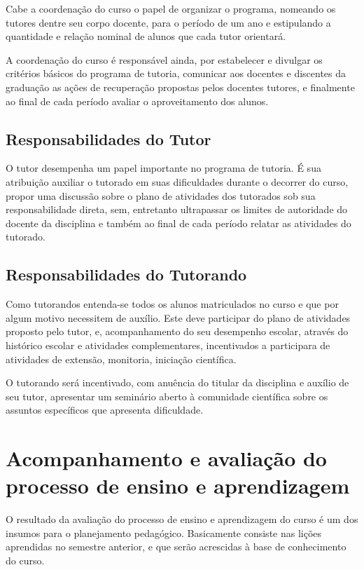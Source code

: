 \documentclass[
	12pt,				%
	openright,			%
  oneside,     %
	a4paper,			%
	english,			%
	french,				%
	spanish,			%
	brazil				%
	]{abntex2}
\begin{document}
Cabe a coordenação do curso o papel de organizar o programa, nomeando os tutores dentre seu corpo docente, para o período de um ano e estipulando a quantidade e relação nominal de alunos que cada tutor orientará.

A coordenação do curso é responsável ainda, por estabelecer e divulgar os critérios básicos do programa de tutoria, comunicar aos docentes e discentes da graduação as ações de recuperação propostas pelos docentes tutores, e finalmente ao final de cada período avaliar o aproveitamento dos alunos.

\subsection{Responsabilidades do Tutor}

O tutor desempenha um papel importante no programa de tutoria. É sua atribuição auxiliar o tutorado em suas dificuldades durante o decorrer do curso, propor uma discussão sobre o plano de atividades dos tutorados sob sua responsabilidade direta, sem, entretanto ultrapassar os limites de autoridade do docente da disciplina e também ao final de cada período relatar as atividades do tutorado.

\subsection{Responsabilidades do Tutorando}

Como tutorandos entenda-se todos os alunos matriculados no curso e que por algum motivo necessitem de auxílio. Este deve participar do plano de atividades proposto pelo tutor, e, acompanhamento do seu desempenho escolar, através do histórico escolar e atividades complementares, incentivados a participara de atividades de extensão, monitoria, iniciação científica.

O tutorando será incentivado, com anuência do titular da disciplina e auxílio de seu tutor, apresentar um seminário aberto à comunidade científica sobre os assuntos específicos que apresenta dificuldade.


\section{Acompanhamento e avaliação do processo de ensino e aprendizagem}

O resultado da avaliação do processo de ensino e aprendizagem do curso é um dos insumos para o planejamento pedagógico. Basicamente consiste nas lições aprendidas no semestre anterior, e que serão acrescidas à base de conhecimento do curso.
\end{document}
